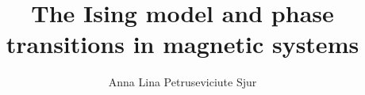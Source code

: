 \documentclass[a4paper, 11pt, twocolumn]{article}
\begin{document}
\title{The Ising model and phase transitions in magnetic systems}

\author{Anna Lina Petruseviciute Sjur}

\twocolumn[
  \begin{@twocolumnfalse}
    \maketitle
    
  \end{@twocolumnfalse}
]














\end{document}
